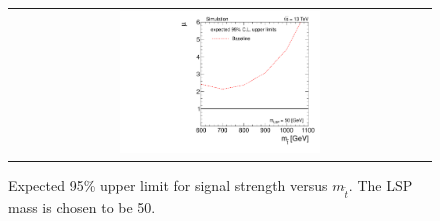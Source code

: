 \begin{figure}[!h]
  \centering
  \begin{tabular}{c}
                \includegraphics[width=0.49\textwidth]{figures/limitplot4BinSel_Baseline_LSP50.pdf} 
  \end{tabular}
  \caption{Expected 95\% upper limit for signal strength versus $m_{\tilde{t}}$. The LSP mass is chosen to be 50\gev.}
  \label{fig:stop_baseline_limit}
\end{figure}

